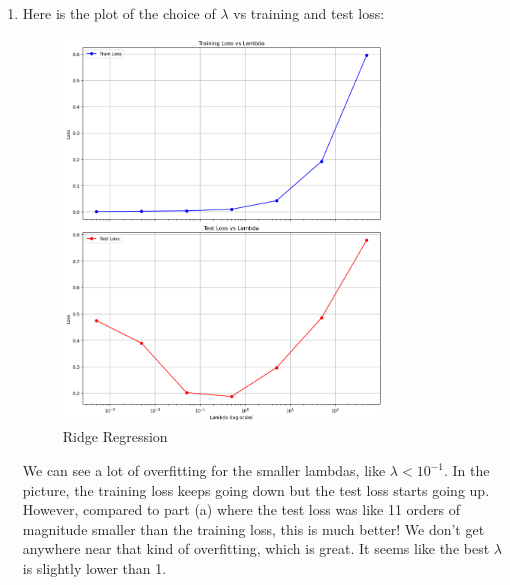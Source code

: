 \documentclass[12pt]{article}
\theoremstyle{definitionstyle}
\begin{document}
\begin{enumerate}[leftmargin=\labelsep]
\begin{enumerate}
            \item Here is the plot of the choice of $\lambda$ vs training and test loss:
            \begin{figure}[H]
                \centering
                \includegraphics[width=0.8\textwidth]{loss_vs_lambda.png}
                \caption{Ridge Regression}
                \label{fig:ridge}
            \end{figure}
            We can see a lot of overfitting for the smaller lambdas, like $\lambda < 10^{-1}$. In the picture, the training loss keeps going down but the test loss starts going up. However, compared to part (a) where the test loss was like 11 orders of magnitude smaller than the training loss, this is much better! We don't get anywhere near that kind of overfitting, which is great. It seems like the best $\lambda$ is slightly lower than 1.


\end{enumerate}
\end{enumerate}
\end{document}
